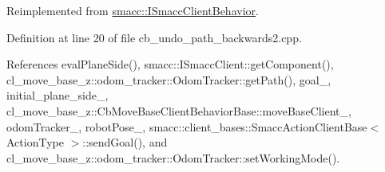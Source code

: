 Reimplemented from \hyperlink{classsmacc_1_1ISmaccClientBehavior_a9877684b1954429719826e2d0924d980}{smacc\+::\+I\+Smacc\+Client\+Behavior}.



Definition at line 20 of file cb\+\_\+undo\+\_\+path\+\_\+backwards2.\+cpp.



References eval\+Plane\+Side(), smacc\+::\+I\+Smacc\+Client\+::get\+Component(), cl\+\_\+move\+\_\+base\+\_\+z\+::odom\+\_\+tracker\+::\+Odom\+Tracker\+::get\+Path(), goal\+\_\+, initial\+\_\+plane\+\_\+side\+\_\+, cl\+\_\+move\+\_\+base\+\_\+z\+::\+Cb\+Move\+Base\+Client\+Behavior\+Base\+::move\+Base\+Client\+\_\+, odom\+Tracker\+\_\+, robot\+Pose\+\_\+, smacc\+::client\+\_\+bases\+::\+Smacc\+Action\+Client\+Base$<$ Action\+Type $>$\+::send\+Goal(), and cl\+\_\+move\+\_\+base\+\_\+z\+::odom\+\_\+tracker\+::\+Odom\+Tracker\+::set\+Working\+Mode().


